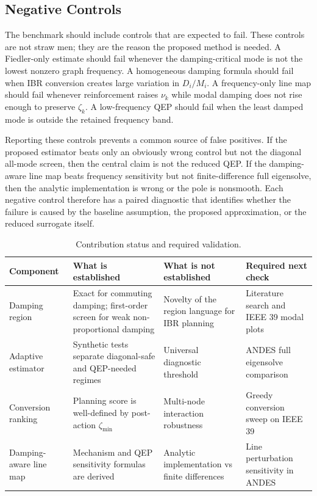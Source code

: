 \documentclass[journal]{IEEEtran}
\begin{document}
\subsection{Negative Controls}

The benchmark should include controls that are expected to fail. These controls are not straw men; they are the reason the proposed method is needed. A Fiedler-only estimate should fail whenever the damping-critical mode is not the lowest nonzero graph frequency. A homogeneous damping formula should fail when IBR conversion creates large variation in $D_i/M_i$. A frequency-only line map should fail whenever reinforcement raises $\nu_k$ while modal damping does not rise enough to preserve $\zeta_k$. A low-frequency QEP should fail when the least damped mode is outside the retained frequency band.

Reporting these controls prevents a common source of false positives. If the proposed estimator beats only an obviously wrong control but not the diagonal all-mode screen, then the central claim is not the reduced QEP. If the damping-aware line map beats frequency sensitivity but not finite-difference full eigensolve, then the analytic implementation is wrong or the pole is nonsmooth. Each negative control therefore has a paired diagnostic that identifies whether the failure is caused by the baseline assumption, the proposed approximation, or the reduced surrogate itself.

\begin{table}[t]
\centering
\caption{Contribution status and required validation.}
\label{tab:status}
\begin{tabular}{p{}p{}p{}p{}}
\toprule
Component & What is established & What is not established & Required next check\\
\midrule
Damping region & Exact for commuting damping; first-order screen for weak non-proportional damping & Novelty of the region language for IBR planning & Literature search and IEEE 39 modal plots\\
Adaptive estimator & Synthetic tests separate diagonal-safe and QEP-needed regimes & Universal diagnostic threshold & ANDES full eigensolve comparison\\
Conversion ranking & Planning score is well-defined by post-action $\zeta_{\min}$ & Multi-node interaction robustness & Greedy conversion sweep on IEEE 39\\
Damping-aware line map & Mechanism and QEP sensitivity formulas are derived & Analytic implementation vs finite differences & Line perturbation sensitivity in ANDES\\
\bottomrule
\end{tabular}
\end{table}
\end{document}
